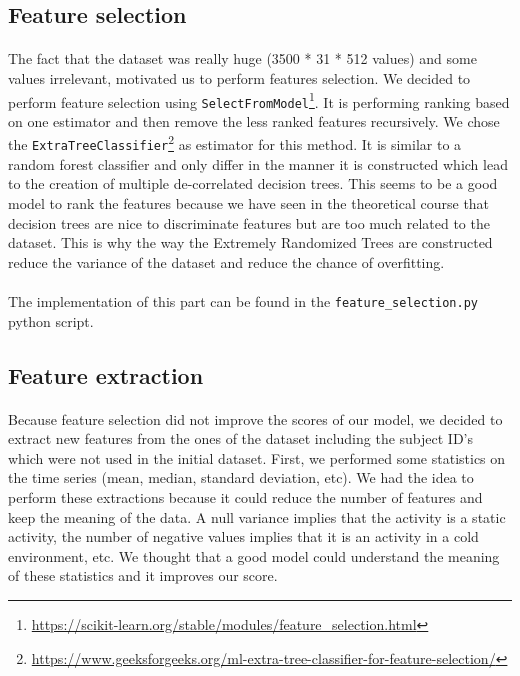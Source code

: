 \documentclass[a4paper, 11pt, oneside]{article}
\begin{document}
\subsection{Feature selection}
\paragraph{}The fact that the dataset was really huge (3500 * 31 * 512 values) and some values irrelevant, motivated us to perform features selection. We decided to perform feature selection using \texttt{SelectFromModel}\footnote{\url{https://scikit-learn.org/stable/modules/feature_selection.html}}. It is performing ranking based on one estimator and then remove the less ranked features recursively. We chose the \texttt{ExtraTreeClassifier}\footnote{\url{https://www.geeksforgeeks.org/ml-extra-tree-classifier-for-feature-selection/}} as estimator for this method. It is similar to a random forest   classifier and only differ in the manner it is constructed which lead to the creation of multiple de-correlated decision trees. This seems to be a good model to rank the features because we have seen in the theoretical course that decision trees are nice to discriminate features but are too much related to the dataset. This is why the way the Extremely Randomized Trees are constructed reduce the variance of the dataset and reduce the chance of overfitting.

\paragraph{}The implementation of this part can be found in the \texttt{feature\_selection.py} python script. 

\subsection{Feature extraction} \label{sec:feature_ex}
\paragraph{}Because feature selection did not improve the scores of our model, we decided to extract new features from the ones of the dataset including the subject ID's which were not used in the initial dataset. First, we performed some statistics on the time series (mean, median, standard deviation, etc). 
We had the idea to perform these extractions because it could reduce the number of features and keep the meaning of the data. A null variance implies that the activity is a static activity, the number of negative values implies that it is an activity in a cold environment, etc.
We thought that a good model could understand the meaning of these statistics and it improves our score. 
\end{document}
